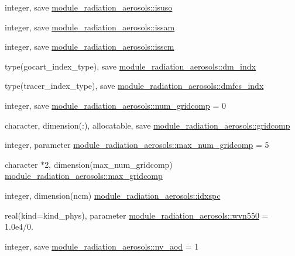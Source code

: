 \begin{DoxyCompactItemize}
\item 
integer, save \hyperlink{group__module__radiation__aerosols_gacddb4dccea82201fd3b193c15c85ec78}{module\+\_\+radiation\+\_\+aerosols\+::isuso}
\item 
integer, save \hyperlink{group__module__radiation__aerosols_gab64435256571a80bbb577fc4f27b39ee}{module\+\_\+radiation\+\_\+aerosols\+::issam}
\item 
integer, save \hyperlink{group__module__radiation__aerosols_ga762cff73e22fefab8adf68d08d5c4df1}{module\+\_\+radiation\+\_\+aerosols\+::isscm}
\item 
type(gocart\+\_\+index\+\_\+type), save \hyperlink{group__module__radiation__aerosols_ga70c58693c0aac6e4dbb6cf425fb0ce6a}{module\+\_\+radiation\+\_\+aerosols\+::dm\+\_\+indx}
\item 
type(tracer\+\_\+index\+\_\+type), save \hyperlink{group__module__radiation__aerosols_gad6c4782fbaae13df20891197b67568ec}{module\+\_\+radiation\+\_\+aerosols\+::dmfcs\+\_\+indx}
\item 
integer, save \hyperlink{group__module__radiation__aerosols_ga6ddeb7b34ad2d6ab1575be3520e85891}{module\+\_\+radiation\+\_\+aerosols\+::num\+\_\+gridcomp} = 0
\item 
character, dimension(\+:), allocatable, save \hyperlink{group__module__radiation__aerosols_ga48c2c6c9c509f5c37fea5d788040ad7a}{module\+\_\+radiation\+\_\+aerosols\+::gridcomp}
\item 
integer, parameter \hyperlink{group__module__radiation__aerosols_gad1187b5d87889c68cbe5929e20e83ac7}{module\+\_\+radiation\+\_\+aerosols\+::max\+\_\+num\+\_\+gridcomp} = 5
\item 
character $\ast$2, dimension(max\+\_\+num\+\_\+gridcomp) \hyperlink{group__module__radiation__aerosols_gac8278b0db773d6ba6ab4d71c9bb1b109}{module\+\_\+radiation\+\_\+aerosols\+::max\+\_\+gridcomp}
\item 
integer, dimension(ncm) \hyperlink{group__module__radiation__aerosols_ga8ca79ca1e5161374aff3cad4121b360f}{module\+\_\+radiation\+\_\+aerosols\+::idxspc}
\item 
real(kind=kind\+\_\+phys), parameter \hyperlink{group__module__radiation__aerosols_ga4555a127ac5bab48353628ea81c55e4e}{module\+\_\+radiation\+\_\+aerosols\+::wvn550} = 1.\+0e4/0.
\item 
integer, save \hyperlink{group__module__radiation__aerosols_ga112670c954eb372efc017253b1096b17}{module\+\_\+radiation\+\_\+aerosols\+::nv\+\_\+aod} = 1
\end{DoxyCompactItemize}
